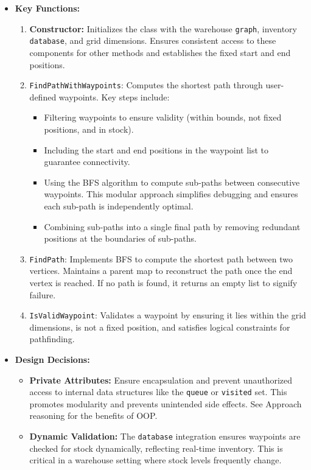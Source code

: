 \begin{itemize}
    \item \textbf{Key Functions:}
    \begin{enumerate}
        \item \textbf{Constructor:} Initializes the class with the warehouse \verb|graph|, inventory \verb|database|, and grid dimensions. Ensures consistent access to these components for other methods and establishes the fixed start and end positions.
        \item {\verb|FindPathWithWaypoints|:} Computes the shortest path through user-defined waypoints. Key steps include:
        \begin{itemize}
            \item Filtering waypoints to ensure validity (within bounds, not fixed positions, and in stock).
            \item Including the start and end positions in the waypoint list to guarantee connectivity.
            \item Using the BFS algorithm to compute sub-paths between consecutive waypoints. This modular approach simplifies debugging and ensures each sub-path is independently optimal.
            \item Combining sub-paths into a single final path by removing redundant positions at the boundaries of sub-paths.
        \end{itemize}
        \item {\verb|FindPath|:} Implements BFS to compute the shortest path between two vertices. Maintains a parent map to reconstruct the path once the end vertex is reached. If no path is found, it returns an empty list to signify failure.
        \item {\verb|IsValidWaypoint|:} Validates a waypoint by ensuring it lies within the grid dimensions, is not a fixed position, and satisfies logical constraints for pathfinding.
    \end{enumerate}
\newpage
    \item \textbf{Design Decisions:}
    \begin{itemize}
        \item \textbf{Private Attributes:} Ensure encapsulation and prevent unauthorized access to internal data structures like the \verb|queue| or \verb|visited| set. This promotes modularity and prevents unintended side effects. See Approach reasoning for the benefits of OOP.
        \item \textbf{Dynamic Validation:} The \verb|database| integration ensures waypoints are checked for stock dynamically, reflecting real-time inventory. This is critical in a warehouse setting where stock levels frequently change.

\end{itemize}
\end{itemize}
